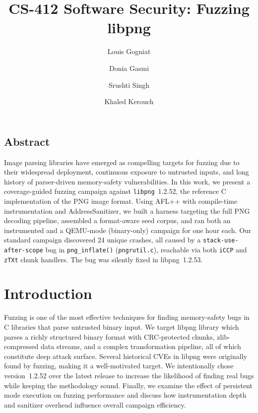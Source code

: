 \documentclass[letterpaper,twocolumn,10pt]{article}
\begin{document}
\date{}

\title{\Large \bf CS-412 Software Security: Fuzzing libpng}

\author{
  {\rm Louis Gogniat} \and
  {\rm Donia Gasmi} \and
  {\rm Srushti Singh} \and
  {\rm Khaled Kerouch}
}

\maketitle
\thispagestyle{empty}

\subsection*{Abstract}
Image parsing libraries have emerged as compelling targets for fuzzing due to their widespread deployment, continuous exposure to untrusted inputs, and long history of parser-driven memory-safety vulnerabilities. In this work, we present a coverage-guided fuzzing campaign against \texttt{libpng}~1.2.52, the reference C implementation of the PNG image format. Using AFL++ with compile-time instrumentation and AddressSanitizer, we built a harness targeting the full PNG decoding pipeline,
assembled a format-aware seed corpus, and ran both an instrumented and a QEMU-mode (binary-only) campaign for one hour each. Our standard campaign discovered 24 unique crashes, all caused by a
\texttt{stack-use-after-scope} bug in \texttt{png\_inflate()}
(\texttt{pngrutil.c}), reachable via both \texttt{iCCP} and
\texttt{zTXt} chunk handlers. The bug was silently fixed in libpng~1.2.53.

\section{Introduction}

Fuzzing is one of the most effective techniques for finding
memory-safety bugs in C libraries that parse untrusted binary
input. We target libpng library which parses a richly structured
binary format with CRC-protected chunks, zlib-compressed data streams,
and a complex transformation pipeline, all of which constitute deep
attack surface. Several historical CVEs in libpng were originally
found by fuzzing, making it a well-motivated target. We intentionally
chose version~1.2.52 over the latest release to increase the
likelihood of finding real bugs while keeping the methodology sound. Finally, we examine the effect of persistent mode execution on fuzzing performance and discuss how instrumentation depth and sanitizer overhead influence overall campaign efficiency.
\end{document}
